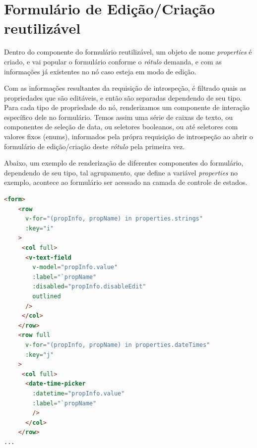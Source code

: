\documentclass[12pt]{article}
\begin{document}
\section{Formulário de Edição/Criação reutilizável}

Dentro do componente do formulário reutilizável, um objeto de nome \textit{properties} é criado, e vai popular o formulário conforme o \textit{rótulo} demanda, e com as informações já existentes no nó caso esteja em modo de edição.

Com as informações resultantes da requisição de introspeção, é filtrado quais as propriedades que são editáveis, e então são separadas dependendo de seu tipo. Para cada tipo de propriedade do nó, renderizamos um componente de interação específico dele no formulário. Temos assim uma série de caixas de texto, ou componentes de seleção de data, ou seletores booleanos, ou até seletores com valores fixos (enums), informados pela própra requisição de introspeção ao abrir o formulário de edição/criação deste \textit{rótulo} pela primeira vez.

Abaixo, um exemplo de renderização de diferentes componentes do formulário, dependendo de seu tipo, tal agrupamento, que define a variável \textit{properties} no exemplo, acontece ao formulário ser acessado na camada de controle de estados.
\begin{lstlisting}[language=HTML]
<form>
    <row
      v-for="(propInfo, propName) in properties.strings"
      :key="i"
    >
     <col full>
      <v-text-field
        v-model="propInfo.value"
        :label="`propName"
        :disabled="propInfo.disableEdit"
        outlined
      />
     </col>
    </row>
    <row full
      v-for="(propInfo, propName) in properties.dateTimes"
      :key="j"
    >
     <col full>
      <date-time-picker
        :datetime="propInfo.value"
        :label="`propName"
        />
      </col>
    </row>
...

\end{lstlisting}
\end{document}
